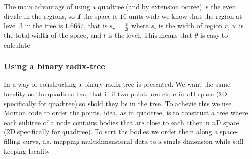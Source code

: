 The main advantage of using a quadtree (and by extension octree) is the even
divide in the regions, so if the space it $10$ units wide we know that the region
at level $3$ in the tree is $1.6667$, that is $s_r=\frac{w}{2l}$ where $s_r$ is the
width of region $r$, $w$ is the total width of the space, and $l$ is the level.
This means that $\theta$ is easy to calculate.

\subsubsection{Using a binary radix-tree}
In \cite{main-ref} a way of constructing a binary radix-tree is presented. We want
the same locality as the quadtree has, that is if two points are close in $n$D
space (2D specifically for quadtree) so shold they be in the tree. To achevie this
we use Morton code \cite{wiki:morton} to order the points.
idea, as in quadtree, is to construct a tree where each subtree of a node contains
bodies that are close to each other in $n$D space (2D specifically for quadtree).
To sort the bodies we order them along a space-filling curve, i.e. mapping
multidimensional data to a single dimension while still keeping locality